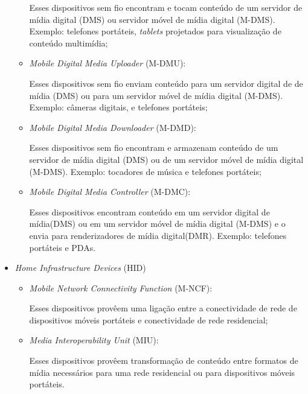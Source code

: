 \begin{itemize}
\begin{itemize}
		Esses dispositivos sem fio encontram e tocam conteúdo de um servidor de mídia digital (DMS) ou servidor móvel de mídia digital (M-DMS). Exemplo: telefones portáteis, \emph{tablets} projetados para visualização de conteúdo multimídia;
		\item \emph{Mobile Digital Media Uploader} (M-DMU): 

		Esses dispositivos sem fio enviam conteúdo para um servidor digital de de mídia (DMS) ou para um servidor móvel de mídia digital (M-DMS). Exemplo: câmeras digitais, e telefones portáteis;
		\item \emph{Mobile Digital Media Downloader} (M-DMD): 

		Esses dispositivos sem fio encontram e armazenam conteúdo de um servidor de mídia digital (DMS) ou de um servidor móvel de mídia digital (M-DMS). Exemplo: tocadores de música e telefones portáteis;
		\item \emph{Mobile Digital Media Controller} (M-DMC): 

		Esses dispositivos encontram conteúdo em um servidor digital de mídia(DMS) ou em um servidor móvel de mídia digital (M-DMS) e o envia para renderizadores de mídia digital(DMR). Exemplo: telefones portáteis e PDAs.
	\end{itemize}
	\item \emph{Home Infrastructure Devices} (HID)
	\begin{itemize}
		\item \emph{Mobile Network Connectivity Function} (M-NCF): 

		Esses dispositivos provêem uma ligação entre a conectividade de rede de dispositivos móveis portáteis e conectividade de rede residencial;
		\item \emph{Media Interoperability Unit} (MIU): 

		Esses dispositivos provêem transformação de conteúdo entre formatos de mídia necessários para uma rede residencial ou para dispositivos móveis portáteis.
	\end{itemize}
\end{itemize}

